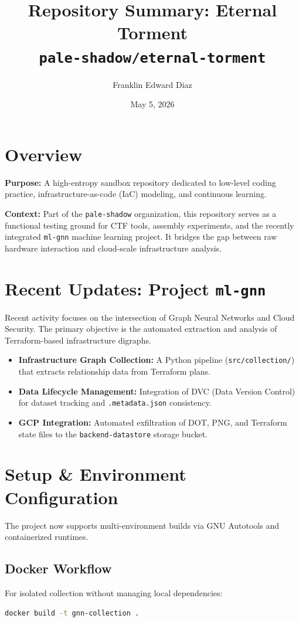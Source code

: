 \documentclass[11pt,a4paper]{article}
\title{
    \textbf{Repository Summary: Eternal Torment}\\
    \large \texttt{pale-shadow/eternal-torment}
}
\author{Franklin Edward Diaz}
\date{May 5, 2026}
\begin{document}
\maketitle

\section{Overview}
\textbf{Purpose:} A high-entropy sandbox repository dedicated to low-level coding practice, infrastructure-as-code (IaC) modeling, and continuous learning.

\textbf{Context:} Part of the \texttt{pale-shadow} organization, this repository serves as a functional testing ground for CTF tools, assembly experiments, and the recently integrated \texttt{ml-gnn} machine learning project. It bridges the gap between raw hardware interaction and cloud-scale infrastructure analysis.

\section{Recent Updates: Project \texttt{ml-gnn}}
Recent activity focuses on the intersection of Graph Neural Networks and Cloud Security. The primary objective is the automated extraction and analysis of Terraform-based infrastructure digraphs.

\begin{itemize}
    \item \textbf{Infrastructure Graph Collection:} A Python pipeline (\texttt{src/collection/}) that extracts relationship data from Terraform plans.
    \item \textbf{Data Lifecycle Management:} Integration of DVC (Data Version Control) for dataset tracking and \texttt{.metadata.json} consistency.
    \item \textbf{GCP Integration:} Automated exfiltration of DOT, PNG, and Terraform state files to the \texttt{backend-datastore} storage bucket.
\end{itemize}

\section{Setup \& Environment Configuration}
The project now supports multi-environment builds via GNU Autotools and containerized runtimes.

\subsection{Docker Workflow}
For isolated collection without managing local dependencies:
\begin{lstlisting}[language=bash]
docker build -t gnn-collection .
\end{lstlisting}
\end{document}
